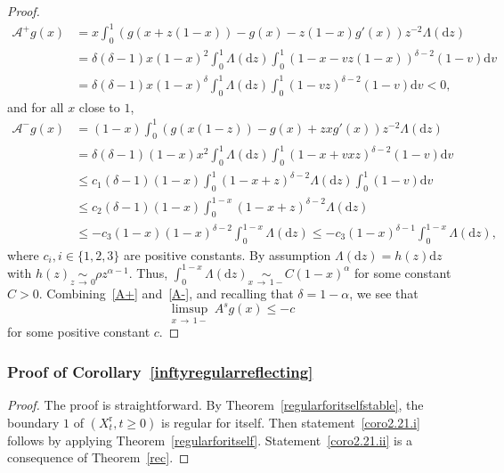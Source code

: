 \documentclass[10pt]{amsart}
\theoremstyle{definition}\newtheorem{defi}[theo]{Definition}\newtheorem{rema}[theo]{Remark}\newtheorem{exam}[theo]{Example}\newtheorem{exem}[theo]{Example}\newtheorem{nota}[theo]{Notation}
\newcommand{\ddr}{\mathrm{d}}
\newcommand{\rmr}{\mathrm{r}}
\newcommand{\clA}{\mathcal{A}}
\begin{document}
\begin{proof}
\begin{equation}\label{A+}
\begin{split}
\clA^{+}g(x)&=x\int_0^1 (g(x+z(1-x))-g(x)-z(1-x) g'(x))z^{-2}\Lambda(\ddr z) \\
&=\delta(\delta-1)x(1-x)^2\int_0^1 \Lambda(\ddr z)\int_0^1(1-x-vz(1-x))^{\delta-2}(1-v)\ddr v\\
&=\delta(\delta-1)x(1-x)^\delta\int_0^1\Lambda(\ddr z)\int_0^1(1-vz)^{\delta-2}(1-v)\ddr v<0,
\end{split}
\end{equation}
and for all $x$ close to $1$,
\begin{equation}\label{A-}
\begin{split}
\clA^{-}g(x)&=(1-x)\int_0^1(g(x(1-z))-g(x)+zxg'(x))z^{-2}\Lambda(\ddr z) \\
&=\delta(\delta-1)(1-x)x^2\int_0^1 \Lambda(\ddr z)\int_0^1 (1-x+vxz)^{\delta-2}(1-v)\ddr v\\
&\leq c_1(\delta-1)(1-x)\int_0^1 (1-x+z)^{\delta-2} \Lambda(\ddr z)\int_0^1(1-v)\ddr v \\
&\leq c_2(\delta-1)(1-x)\int_0^{1-x} (1-x+z)^{\delta-2} \Lambda(\ddr z) \\
&\leq -c_3(1-x)(1-x)^{\delta-2}\int_0^{1-x}\Lambda(\ddr z) \leq -c_3(1-x)^{\delta-1}\int_0^{1-x}\Lambda(\ddr z),
\end{split}
\end{equation}
where $c_i, i\in \{1,2,3\}$ are positive constants. By assumption $\Lambda(\ddr z)=h(z)\ddr z$ with $h(z)\underset{z\,\rightarrow\,0}{\sim} \rho z^{\alpha-1}$. Thus, $\int_0^{1-x}\Lambda(\ddr z)\underset{x\,\rightarrow\,1-}{\sim} C(1-x)^{\alpha}$ for some constant $C>0$. Combining~\eqref{A+} and~\eqref{A-}, and recalling that $\delta=1-\alpha$, we see that
\[
\underset{x\,\rightarrow\,1-}{\limsup}\ A^sg(x)\leq -c
\] 
for some positive constant $c$.
\end{proof}


\subsubsection{Proof of Corollary~\ref{inftyregularreflecting}}
\begin{proof}
The proof is straightforward. By Theorem~\ref{regularforitselfstable}, the boundary $1$ of $(X_t^{\rmr},t\geq 0)$ is regular for itself. Then statement~\eqref{coro2.21.i} follows by applying Theorem~\ref{regularforitself}. Statement~\eqref{coro2.21.ii} is a consequence of Theorem~\ref{rec}. 
\end{proof}
\end{document}
